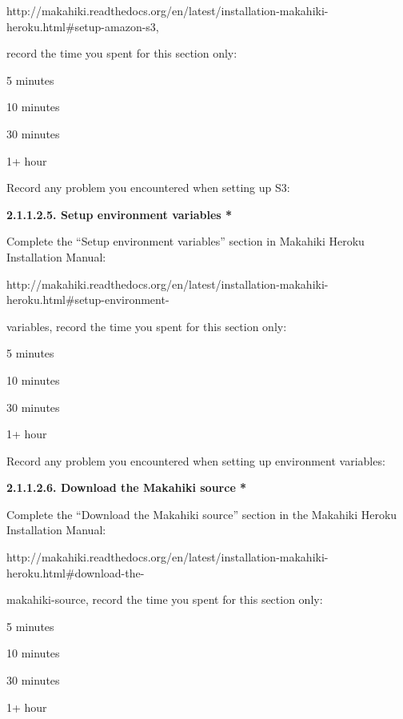 http://makahiki.readthedocs.org/en/latest/installation-makahiki-heroku.html\#setup-amazon-s3, 

record the time you spent for this section only:

\begin{radiobutton}
\item 5 minutes
\item  10 minutes
\item  30 minutes
\item  1+ hour
\end{radiobutton}

Record any problem you encountered when setting up S3: \underline{\hspace{4cm}}

{\bf 2.1.1.2.5. Setup environment variables *}

Complete the ``Setup environment variables'' section in Makahiki Heroku Installation Manual:

http://makahiki.readthedocs.org/en/latest/installation-makahiki-heroku.html\#setup-environment-

variables, record the time you spent for this section only:

\begin{radiobutton}
\item 5 minutes
\item  10 minutes
\item  30 minutes
\item  1+ hour
\end{radiobutton}

Record any problem you encountered when setting up environment variables: \underline{\hspace{2cm}}

{\bf 2.1.1.2.6. Download the Makahiki source *}

Complete the ``Download the Makahiki source'' section in the Makahiki Heroku Installation Manual:

http://makahiki.readthedocs.org/en/latest/installation-makahiki-heroku.html\#download-the-

makahiki-source,  record the time you spent for this section only:

\begin{radiobutton}
\item 5 minutes
\item  10 minutes
\item  30 minutes
\item  1+ hour
\end{radiobutton}

